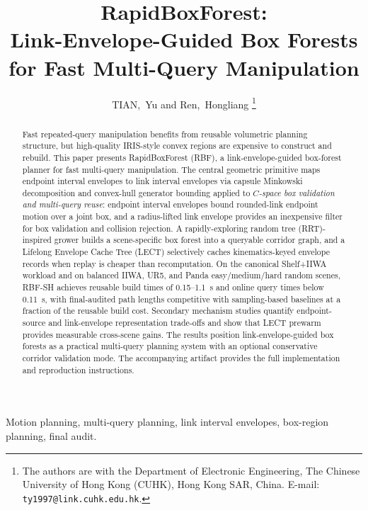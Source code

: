 \documentclass[journal]{IEEEtran}
\DeclareRobustCommand{\textsc}[1]{\textnormal{\MakeUppercase{#1}}}
\newcommand{\rbf}{\textsc{RBF}}
\begin{document}
\title{RapidBoxForest:\\ Link-Envelope-Guided Box Forests for Fast Multi-Query Manipulation}

\author{TIAN,~Yu and Ren,~Hongliang%
\thanks{The authors are with the Department of Electronic Engineering,
The Chinese University of Hong Kong (CUHK), Hong Kong SAR, China.
E-mail: \texttt{ty1997@link.cuhk.edu.hk}.}}

\maketitle

\begin{abstract}
Fast repeated-query manipulation benefits from reusable volumetric planning
structure, but high-quality IRIS-style convex regions are expensive to construct
and rebuild. This paper presents RapidBoxForest (\rbf{}), a link-envelope-guided
box-forest planner for fast multi-query manipulation. The central geometric primitive maps endpoint interval envelopes to link
interval envelopes via capsule Minkowski decomposition and convex-hull generator
bounding applied to \emph{$C$-space box validation and multi-query reuse}:
endpoint interval envelopes bound rounded-link endpoint motion over a joint box,
and a radius-lifted link envelope provides an inexpensive filter for box
validation and collision rejection. A rapidly-exploring random tree
(RRT)-inspired grower builds a scene-specific box forest into a queryable
corridor graph, and a Lifelong Envelope Cache Tree (LECT) selectively caches
kinematics-keyed envelope records when replay is cheaper than recomputation. On the canonical Shelf+IIWA workload and on balanced IIWA,
UR5, and Panda easy/medium/hard random scenes, RBF-SH achieves reusable build
times of 0.15--1.1~s and online query times below 0.11~s, with final-audited
path lengths competitive with sampling-based baselines at a fraction of the
reusable build cost. Secondary mechanism studies quantify endpoint-source and
link-envelope representation trade-offs and show that LECT prewarm provides
measurable cross-scene gains. The results position link-envelope-guided box
forests as a practical multi-query planning system with an optional conservative
corridor validation mode. The accompanying artifact provides the full
implementation and reproduction instructions.
\end{abstract}

\begin{IEEEkeywords}
Motion planning, multi-query planning, link interval envelopes, box-region planning, final audit.
\end{IEEEkeywords}
\end{document}
